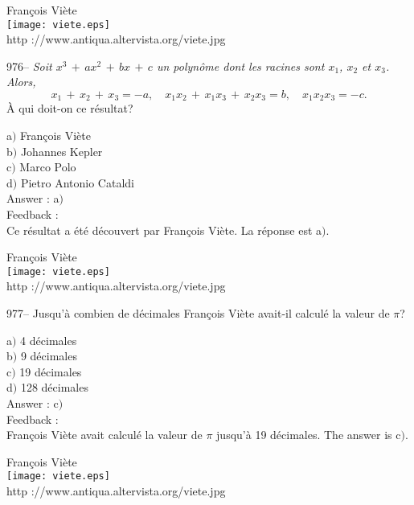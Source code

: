 ﻿\documentclass[letterpaper, 12pt]{article}
\begin{document}
        \begin{center}
        Fran\c cois Vi\`ete\\
    \texttt{[image: viete.eps]}\\
        {\footnotesize http ://www.antiqua.altervista.org/viete.jpg}
    \end{center}

976-- {\sl Soit $x^3\,+\,ax^2\,+\,bx\,+\,c$ un polyn\^ome dont les
racines sont $x_1$, $x_2$ et $x_3$. Alors,
$$x_1\,+\,x_2\,+\,x_3=-a,\quad x_1x_2\,+\,x_1x_3\,+\,x_2x_3=b,\quad
x_1x_2x_3=-c.$$}
\`A qui doit-on ce r\'esultat?

a$)$ Fran\c cois Vi\`ete \\
b$)$ Johannes Kepler  \\
c$)$ Marco Polo  \\
d$)$ Pietro Antonio Cataldi\\

Answer : a$)$\\

Feedback : \\
Ce r\'esultat a \'et\'e d\'ecouvert par Fran\c cois Vi\`ete. La
r\'eponse est a$)$.

        \begin{center}
        Fran\c cois Vi\`ete\\
    \texttt{[image: viete.eps]}\\
        {\footnotesize http ://www.antiqua.altervista.org/viete.jpg}
    \end{center}

977-- Jusqu'\`a combien de d\'ecimales Fran\c cois Vi\`ete avait-il
calcul\'e la valeur de $\pi$?

a$)$ 4 d\'ecimales\\
b$)$ 9 d\'ecimales \\
c$)$ 19 d\'ecimales \\
d$)$ 128 d\'ecimales\\

Answer : c$)$\\

Feedback : \\
Fran\c cois Vi\`ete avait calcul\'e la valeur de $\pi$ jusqu'\`a 19
d\'ecimales. The answer is c$)$.

        \begin{center}
        Fran\c cois Vi\`ete\\
    \texttt{[image: viete.eps]}\\
        {\footnotesize http ://www.antiqua.altervista.org/viete.jpg}
    \end{center}
\end{document}

